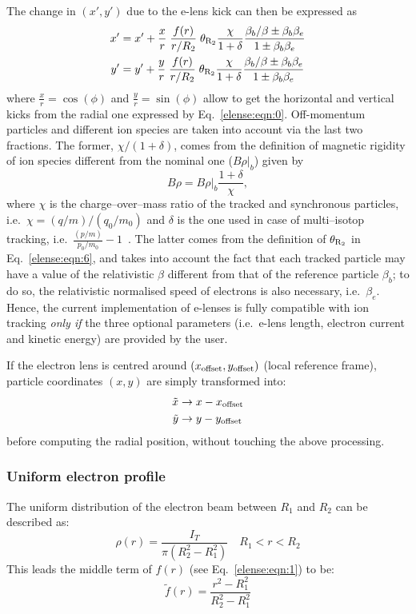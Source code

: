 \documentclass[english]{article}
\begin{document}
The change in $(x',y')$ due to the e-lens kick can then be expressed as
\begin{align}
x'&=x'+\frac{x}{r}\;\frac{f(r)}{r/R_2}\;\theta_{\rm R_2}\frac{\chi}{1+\delta}\frac{\beta_b/\beta\pm\beta_b\beta_e}{1\pm\beta_b\beta_e}\label{elense:eqn:2}\\
y'&=y'+\frac{y}{r}\;\frac{f(r)}{r/R_2}\;\theta_{\rm R_2}\frac{\chi}{1+\delta}\frac{\beta_b/\beta\pm\beta_b\beta_e}{1\pm\beta_b\beta_e}\label{elense:eqn:3}
\end{align}
where $\frac{x}{r}=\cos(\phi)$ and $\frac{y}{r}=\sin(\phi)$ allow to get the
horizontal and vertical kicks from the radial one expressed by
Eq.~\ref{elense:eqn:0}.
Off-momentum particles and different ion species are taken into
account via the last two fractions. The former, $\chi/(1+\delta)$,
comes from the definition of magnetic rigidity of ion species different
from the nominal one ($B\rho|_b$) given by
\begin{equation}
  B\rho = B\rho|_b \frac{1+\delta}{\chi},
\end{equation}
where $\chi$ is the charge--over--mass ratio of the tracked and synchronous
particles, i.e.~$\chi=(q/m)/(q_0/m_0)$ and $\delta$ is the one used in case of
multi--isotop tracking, i.e.~$\frac{(p/m)}{p_0/m_0}-1$~\cite{Hermes:2241364}.
The latter comes from the definition of $\theta_{\rm R_2}$ in Eq.~\ref{elense:eqn:6},
and takes into account the fact that each tracked particle may have a value of
the relativistic $\beta$ different from that of the reference particle $\beta_b$;
to do so, the relativistic normalised speed of electrons is also necessary,
i.e.~$\beta_e$. Hence, the current implementation of e-lenses is fully compatible
with ion tracking \emph{only if} the three optional parameters (i.e.~e-lens length,
electron current and kinetic energy) are provided by the user.

If the electron lens is centred around $(x_{\rm offset},y_{\rm offset})$
(local reference frame), particle coordinates $(x,y)$ are simply transformed
into:
\begin{align}
\tilde x&\rightarrow x-x_{\rm offset}\\
\tilde y&\rightarrow y-y_{\rm offset}\\
\end{align}
before computing the radial position, without touching the above processing.

\subsubsection{Uniform electron profile}
The uniform distribution of the electron beam between $R_1$ and $R_2$
can be described as:
\begin{equation}
\rho(r) = \frac{I_T}{\pi (R_2^2 -R_1^2) } \quad R_1 < r < R_2
\end{equation}
This leads the middle term of $f(r)$ (see Eq.~\ref{elense:eqn:1}) to be:
\begin{equation}
\tilde f(r)=\frac{r^2-R_1^2}{R_2^2-R_1^2}
\end{equation}
\end{document}

